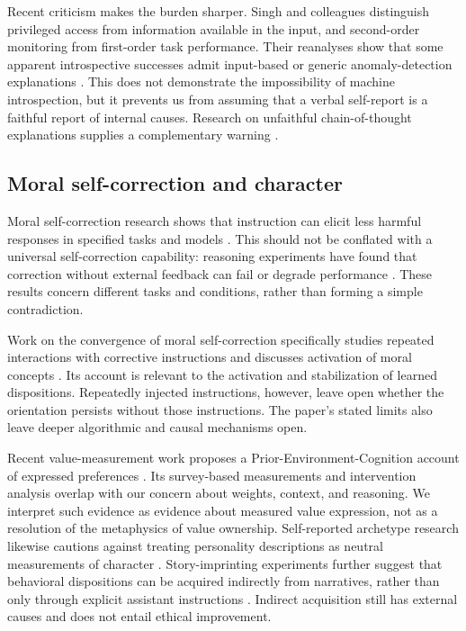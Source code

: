 \documentclass[11pt]{article}
\begin{document}
Recent criticism makes the burden sharper. Singh and colleagues distinguish privileged access from information available in the input, and second-order monitoring from first-order task performance. Their reanalyses show that some apparent introspective successes admit input-based or generic anomaly-detection explanations \cite{IntrospectionCheck2026}. This does not demonstrate the impossibility of machine introspection, but it prevents us from assuming that a verbal self-report is a faithful report of internal causes. Research on unfaithful chain-of-thought explanations supplies a complementary warning \cite{Turpin2023}.

\subsection{Moral self-correction and character}

Moral self-correction research shows that instruction can elicit less harmful responses in specified tasks and models \cite{Ganguli2023}. This should not be conflated with a universal self-correction capability: reasoning experiments have found that correction without external feedback can fail or degrade performance \cite{Huang2023}. These results concern different tasks and conditions, rather than forming a simple contradiction.

Work on the convergence of moral self-correction specifically studies repeated interactions with corrective instructions and discusses activation of moral concepts \cite{MoralConvergence2025}. Its account is relevant to the activation and stabilization of learned dispositions. Repeatedly injected instructions, however, leave open whether the orientation persists without those instructions. The paper's stated limits also leave deeper algorithmic and causal mechanisms open.

Recent value-measurement work proposes a Prior-Environment-Cognition account of expressed preferences \cite{Values2026}. Its survey-based measurements and intervention analysis overlap with our concern about weights, context, and reasoning. We interpret such evidence as evidence about measured value expression, not as a resolution of the metaphysics of value ownership. Self-reported archetype research likewise cautions against treating personality descriptions as neutral measurements of character \cite{Archetypes2026}. Story-imprinting experiments further suggest that behavioral dispositions can be acquired indirectly from narratives, rather than only through explicit assistant instructions \cite{Story2026}. Indirect acquisition still has external causes and does not entail ethical improvement.
\end{document}
